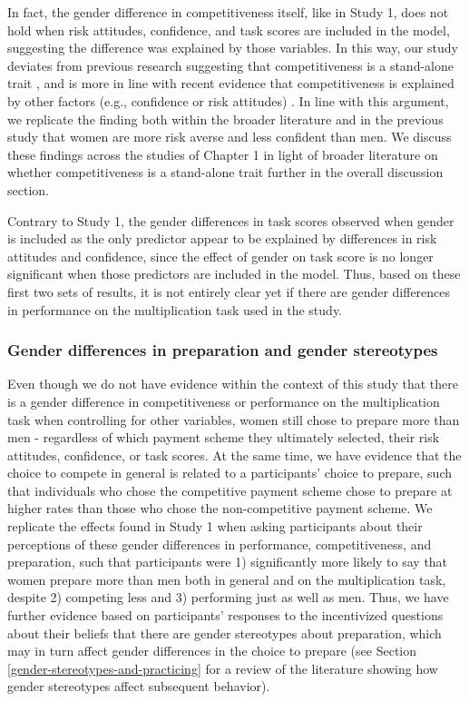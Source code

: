\documentclass[letterpaper, nobind]{templates/ociamthesis}
\begin{document}
In fact, the gender difference in competitiveness itself, like in Study 1, does not hold when risk attitudes, confidence, and task scores are included in the model, suggesting the difference was explained by those variables. In this way, our study deviates from previous research suggesting that competitiveness is a stand-alone trait \autocite{Niederle2007}, and is more in line with recent evidence that competitiveness is explained by other factors (e.g., confidence or risk attitudes) \autocite{Gillen2019,Veldhuizen2017}. In line with this argument, we replicate the finding both within the broader literature and in the previous study that women are more risk averse and less confident than men. We discuss these findings across the studies of Chapter 1 in light of broader literature on whether competitiveness is a stand-alone trait further in the overall discussion section.

Contrary to Study 1, the gender differences in task scores observed when gender is included as the only predictor appear to be explained by differences in risk attitudes and confidence, since the effect of gender on task score is no longer significant when those predictors are included in the model. Thus, based on these first two sets of results, it is not entirely clear yet if there are gender differences in performance on the multiplication task used in the study.

\hypertarget{gender-differences-in-preparation-and-gender-stereotypes}{%
\subsubsection{Gender differences in preparation and gender stereotypes}\label{gender-differences-in-preparation-and-gender-stereotypes}}

Even though we do not have evidence within the context of this study that there is a gender difference in competitiveness or performance on the multiplication task when controlling for other variables, women still chose to prepare more than men - regardless of which payment scheme they ultimately selected, their risk attitudes, confidence, or task scores. At the same time, we have evidence that the choice to compete in general is related to a participants' choice to prepare, such that individuals who chose the competitive payment scheme chose to prepare at higher rates than those who chose the non-competitive payment scheme. We replicate the effects found in Study 1 when asking participants about their perceptions of these gender differences in performance, competitiveness, and preparation, such that participants were 1) significantly more likely to say that women prepare more than men both in general and on the multiplication task, despite 2) competing less and 3) performing just as well as men. Thus, we have further evidence based on participants' responses to the incentivized questions about their beliefs that there are gender stereotypes about preparation, which may in turn affect gender differences in the choice to prepare (see Section \ref{gender-stereotypes-and-practicing} for a review of the literature showing how gender stereotypes affect subsequent behavior).
\end{document}
